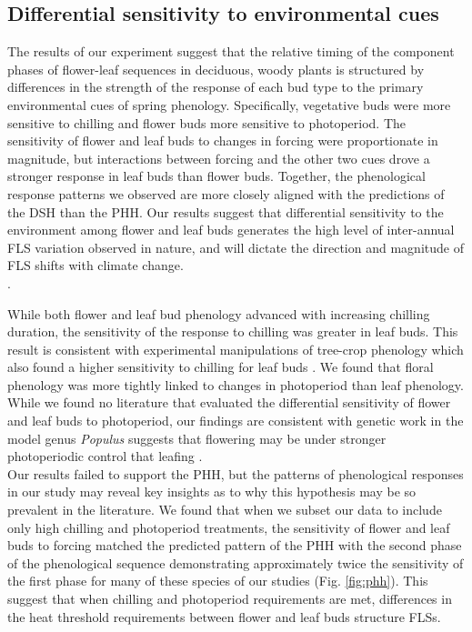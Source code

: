 \documentclass[11pt]{article}
\begin{document}
\subsection*{Differential sensitivity to environmental cues}
\noindent The results of our experiment suggest that the relative timing of the component phases of flower-leaf sequences in deciduous, woody plants is structured by differences in the strength of the response of each bud type to the primary environmental cues of spring phenology. Specifically, vegetative buds were more sensitive to chilling and flower buds more sensitive to photoperiod. The sensitivity of flower and leaf buds to changes in forcing were proportionate in magnitude, but interactions between forcing and the other two cues drove a stronger response in leaf buds than flower buds. Together, the phenological response patterns we observed are more closely aligned with the predictions of the DSH than the PHH. Our results suggest that differential sensitivity to the environment among flower and leaf buds generates the high level of inter-annual FLS variation observed in nature, and will dictate the direction and magnitude of FLS shifts with climate change.\\.

\noindent While both flower and leaf bud phenology advanced with increasing chilling duration, the sensitivity of the response to chilling was greater in leaf buds. This result is consistent with experimental manipulations of tree-crop phenology which also found a higher sensitivity to chilling for leaf buds \citep{Gariglio2006,Citadin2001}. We found that floral phenology was more tightly linked to changes in photoperiod than leaf phenology. While we found no literature that evaluated the differential sensitivity of flower and leaf buds to photoperiod, our findings are consistent with genetic work in the model genus \textit{Populus} suggests that flowering may be under stronger photoperiodic control that leafing \citep{}.\\

\noindent Our results failed to support the PHH, but the patterns of phenological responses in our study may reveal key insights as to why this hypothesis may be so prevalent in the literature. We found that when we subset our data to include only high chilling and photoperiod treatments, the sensitivity of flower and leaf buds to forcing matched the predicted pattern of the PHH with the second phase of the phenological sequence demonstrating approximately twice the sensitivity of the first phase for many of these species of our studies (Fig. \ref{fig:phh}). This suggest that when chilling and photoperiod requirements are met, differences in the heat threshold requirements between flower and leaf buds structure FLSs.\\
\end{document}
